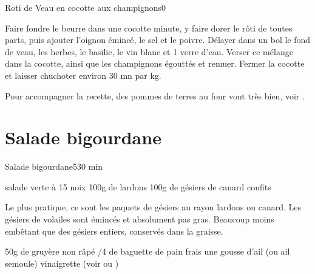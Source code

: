 {\begin{recette}{Roti de Veau en cocotte aux champignons}{0}{}{}
\begin{preparation}
\etape Faire fondre le beurre dans une cocotte minute, y faire dorer le rôti de toutes parts, puis ajouter l'oignon émincé, le 
sel et le poivre.
\etape Délayer dans un bol le fond de veau, les herbes, le basilic, le vin blanc et 1 verre d'eau. Verser ce mélange dans la 
cocotte, ainsi que les champignons égouttés et remuer.
\etape Fermer la cocotte et laisser chuchoter environ 30 mn par kg.
\end{preparation}

\begin{remarque}
Pour accompagner la recette, des pommes de terres au four vont très bien, voir .
\end{remarque}
\end{recette}

\section{Salade bigourdane}
\begin{recette}{Salade bigourdane}{5}{30 min}{}
\begin{ingredients}
\ingredient salade verte
 à 15 noix
\ingredient 100g de lardons
\ingredient 100g de gésiers de canard confits
\begin{remarque}
Le plus pratique, ce sont les paquets de gésiers au rayon lardons ou canard. Les gésiers de volailes sont émincés et absolument 
pas gras. Beaucoup moins embêtant que des gésiers entiers, conservés dans la graisse.
\end{remarque}
\ingredient 50g de gruyère non râpé
/4 de baguette de pain frais
\ingredient une gousse d'ail (ou ail semoule)
\ingredient vinaigrette (voir  ou )

\end{ingredients}


\end{recette}}

